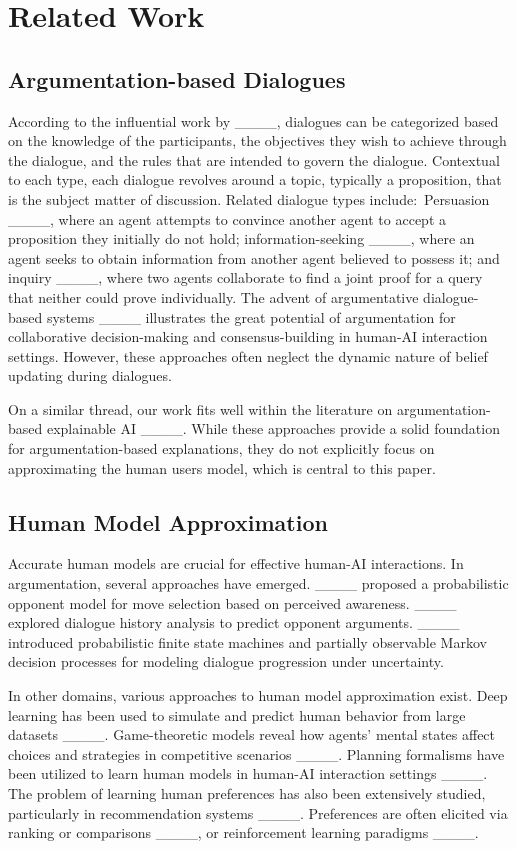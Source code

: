 \section{Related Work}
\subsection{Argumentation-based Dialogues}

According to the influential work by ____, dialogues can be categorized based on the knowledge of the participants, the objectives they wish to achieve through the dialogue, and the rules that are intended to govern the dialogue. Contextual to each type, each dialogue revolves around a topic, typically a proposition, that is the subject matter of discussion. Related dialogue types include:~Persuasion ____, where an agent attempts to convince another agent to accept a proposition they initially do not hold; information-seeking ____, where an agent seeks to obtain information from another agent believed to possess it; and inquiry ____, where two agents collaborate to find a joint proof for a query that neither could prove individually. The advent of argumentative dialogue-based systems ____ illustrates the great potential of argumentation for collaborative decision-making and consensus-building in human-AI interaction settings. However, these approaches often neglect the dynamic nature of belief updating during dialogues.
 
On a similar thread, our work fits well within the literature on argumentation-based explainable AI ____. While these approaches provide a solid foundation for argumentation-based explanations, they do not explicitly focus on approximating the human users model, which is central to this paper. 

\subsection{Human Model Approximation}

Accurate human models are crucial for effective human-AI interactions. In argumentation, several approaches have emerged. ____ proposed a probabilistic opponent model for move selection based on perceived awareness. ____ explored dialogue history analysis to predict opponent arguments. ____ introduced probabilistic finite state machines and partially observable Markov decision processes for modeling dialogue progression under uncertainty.

In other domains, various approaches to human model approximation exist. Deep learning has been used to simulate and predict human behavior from large datasets ____. Game-theoretic models reveal how agents' mental states affect choices and strategies in competitive scenarios ____. Planning formalisms have been utilized to learn human models in human-AI interaction settings ____. The problem of learning human preferences has also been extensively studied, particularly in recommendation systems ____. Preferences are often elicited via ranking or comparisons ____, or reinforcement learning paradigms ____.


